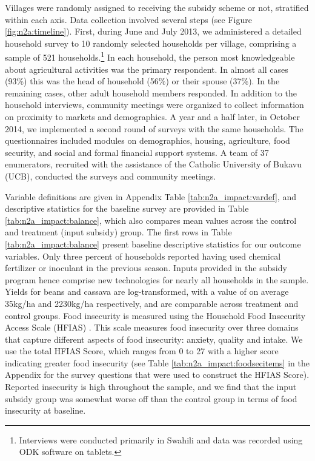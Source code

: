 Villages were randomly assigned to receiving the subsidy scheme or not, stratified within each axis. Data collection involved several steps (see Figure \ref{fig:n2a:timeline}). First, during June and July 2013, we administered a detailed household survey to 10 randomly selected households per village, comprising a sample of 521 households.\footnote{Interviews were conducted primarily in Swahili and data was recorded using ODK software on tablets.} In each household, the person most knowledgeable about agricultural activities was the primary respondent. In almost all cases (93\%) this was the head of household (56\%) or their spouse (37\%). In the remaining cases, other adult household members responded. In addition to the household interviews, community meetings were organized to collect information on proximity to markets and demographics. A year and a half later, in October 2014, we implemented a second round of surveys with the same households. The questionnaires included modules on demographics, housing, agriculture, food security, and social and formal financial support systems. A team of 37 enumerators, recruited with the assistance of the Catholic University of Bukavu (UCB), conducted the surveys and community meetings.




Variable definitions are given in Appendix Table \ref{tab:n2a_impact:vardef}, and descriptive statistics for the baseline survey are provided in Table \ref{tab:n2a_impact:balance}, which also compares mean values across the control and treatment (input subsidy) group. The first rows in Table \ref{tab:n2a_impact:balance} present baseline descriptive statistics for our outcome variables. Only three percent of households reported having used chemical fertilizer or inoculant in the previous season. Inputs provided in the subsidy program hence comprise new technologies for nearly all households in the sample. Yields for beans and cassava are log-transformed, with a value of on average 35kg/ha and 2230kg/ha respectively, and are comparable across treatment and control groups. Food insecurity is measured using the Household Food Insecurity Access Scale (HFIAS) \citep{Coates2007}. This scale measures food insecurity over three domains that capture different aspects of food insecurity: anxiety, quality and intake. We use the total HFIAS Score, which ranges from 0 to 27 with a higher score indicating greater food insecurity (see Table \ref{tab:n2a_impact:foodsecitems} in the Appendix for the survey questions that were used to construct the HFIAS Score). Reported insecurity is high throughout the sample, and we find that the input subsidy group was somewhat worse off than the control group in terms of food insecurity at baseline. 

